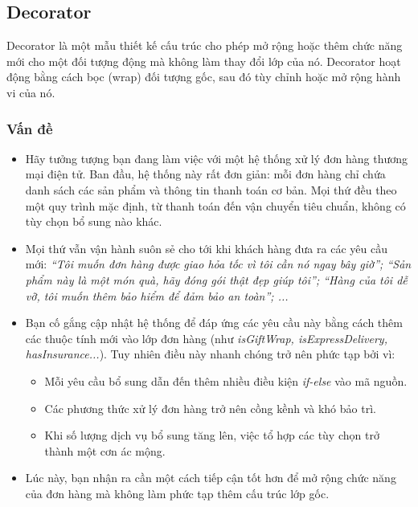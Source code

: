 \thispagestyle{empty}
\subsection{Decorator}

Decorator là một mẫu thiết kế cấu trúc cho phép mở rộng hoặc thêm chức năng mới cho một đối tượng động mà không làm thay đổi lớp của nó. Decorator hoạt động bằng cách bọc (wrap) đối tượng gốc, sau đó tùy chỉnh hoặc mở rộng hành vi của nó. 

\subsubsection{Vấn đề}
\begin{itemize}
    \item Hãy tưởng tượng bạn đang làm việc với một hệ thống xử lý đơn hàng thương mại điện tử. Ban đầu, hệ thống này rất đơn giản: mỗi đơn hàng chỉ chứa danh sách các sản phẩm và thông tin thanh toán cơ bản. Mọi thứ đều theo một quy trình mặc định, từ thanh toán đến vận chuyển tiêu chuẩn, không có tùy chọn bổ sung nào khác.
    \item Mọi thứ vẫn vận hành suôn sẻ cho tới khi khách hàng đưa ra các yêu cầu mới: \textit{“Tôi muốn đơn hàng được giao hỏa tốc vì tôi cần nó ngay bây giờ”; “Sản phẩm này là một món quà, hãy đóng gói thật đẹp giúp tôi”; “Hàng của tôi dễ vỡ, tôi muốn thêm bảo hiểm để đảm bảo an toàn”; ...}
    \item Bạn cố gắng cập nhật hệ thống để đáp ứng các yêu cầu này bằng cách thêm các thuộc tính mới vào lớp đơn hàng (như \textit{isGiftWrap, isExpressDelivery, hasInsurance...}). Tuy nhiên điều này nhanh chóng trở nên phức tạp bởi vì:
    \begin{itemize}
        \item Mỗi yêu cầu bổ sung dẫn đến thêm nhiều điều kiện \textit{if-else} vào mã nguồn.
        \item Các phương thức xử lý đơn hàng trở nên cồng kềnh và khó bảo trì.
        \item Khi số lượng dịch vụ bổ sung tăng lên, việc tổ hợp các tùy chọn trở thành một cơn ác mộng.
    \end{itemize}
    \item Lúc này, bạn nhận ra cần một cách tiếp cận tốt hơn để mở rộng chức năng của đơn hàng mà không làm phức tạp thêm cấu trúc lớp gốc.
\end{itemize}

